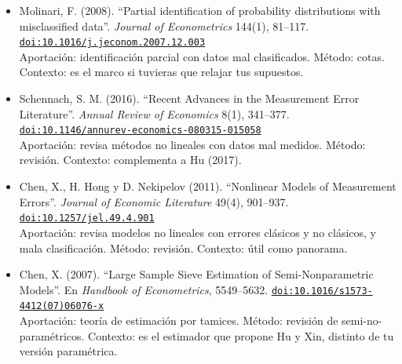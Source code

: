 \documentclass[11pt]{article}
\begin{document}
\begin{itemize}
\item Molinari, F. (2008). ``Partial identification of probability distributions with misclassified data''. \textit{Journal of Econometrics} 144(1), 81--117. \href{https://doi.org/10.1016/j.jeconom.2007.12.003}{\texttt{doi:10.1016/j.jeconom.2007.12.003}}\\
Aportación: identificación parcial con datos mal clasificados. Método: cotas. Contexto: es el marco si tuvieras que relajar tus supuestos.
\item Schennach, S. M. (2016). ``Recent Advances in the Measurement Error Literature''. \textit{Annual Review of Economics} 8(1), 341--377. \href{https://doi.org/10.1146/annurev-economics-080315-015058}{\texttt{doi:10.1146/annurev-economics-080315-015058}}\\
Aportación: revisa métodos no lineales con datos mal medidos. Método: revisión. Contexto: complementa a Hu (2017).
\item Chen, X., H. Hong y D. Nekipelov (2011). ``Nonlinear Models of Measurement Errors''. \textit{Journal of Economic Literature} 49(4), 901--937. \href{https://doi.org/10.1257/jel.49.4.901}{\texttt{doi:10.1257/jel.49.4.901}}\\
Aportación: revisa modelos no lineales con errores clásicos y no clásicos, y mala clasificación. Método: revisión. Contexto: útil como panorama.
\item Chen, X. (2007). ``Large Sample Sieve Estimation of Semi-Nonparametric Models''. En \textit{Handbook of Econometrics}, 5549--5632. \href{https://doi.org/10.1016/s1573-4412(07)06076-x}{\texttt{doi:10.1016/s1573-4412(07)06076-x}}\\
Aportación: teoría de estimación por tamices. Método: revisión de semi-no-paramétricos. Contexto: es el estimador que propone Hu y Xin, distinto de tu versión paramétrica.
\end{itemize}
\end{document}
